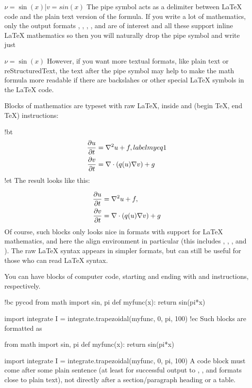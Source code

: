 \documentclass[%
oneside,                 %
final,                   %
10pt]{article}
\begin{document}
\bccq
$\nu = \sin(x)$|$v = sin(x)$
\eccq
The pipe symbol acts as a delimiter between {\LaTeX} code and the plain text
version of the formula. If you write a lot of mathematics, only the
output formats , , , , and 
are of interest
and all these support inline {\LaTeX} mathematics so then you will naturally
drop the pipe symbol and write just

\bccq
$\nu = \sin(x)$
\eccq
However, if you want more textual formats, like plain text or reStructuredText,
the text after the pipe symbol may help to make the math formula more readable
if there are backslahes or other special {\LaTeX} symbols in the {\LaTeX} code.

Blocks of mathematics are typeset with raw {\LaTeX}, inside
 and  (begin TeX, end TeX) instructions:

\bccq
!bt
\begin{align}
{\partial u\over\partial t} &= \nabla^2 u + f, label{myeq1}\\ 
{\partial v\over\partial t} &= \nabla\cdot(q(u)\nabla v) + g
\end{align}
!et
\eccq
The result looks like this:

\begin{align}
{\partial u\over\partial t} &= \nabla^2 u + f, \label{myeq1}\\ 
{\partial v\over\partial t} &= \nabla\cdot(q(u)\nabla v) + g
\end{align}
Of course, such blocks only looks nice in formats with support
for {\LaTeX} mathematics, and here the align environment in particular
(this includes , , , and ). The raw
{\LaTeX} syntax appears in simpler formats, but can still be useful
for those who can read {\LaTeX} syntax.

You can have blocks of computer code, starting and ending with
 and  instructions, respectively.

\bccq
!bc pycod
from math import sin, pi
def myfunc(x):
    return sin(pi*x)

import integrate
I = integrate.trapezoidal(myfunc, 0, pi, 100)
!ec
\eccq
Such blocks are formatted as

\bpycod
from math import sin, pi
def myfunc(x):
    return sin(pi*x)

import integrate
I = integrate.trapezoidal(myfunc, 0, pi, 100)
\epycod
A code block must come after some plain sentence (at least for successful
output to , , and formats close to plain text),
not directly after a section/paragraph heading or a table.
\end{document}

